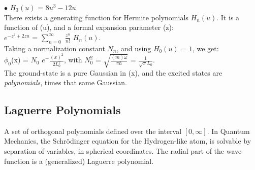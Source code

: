 \documentclass[a4paper, 10pt, onepage]{elegantbook}
\begin{document}
$\bullet$ $H_3(u)$ = $8u^3 - 12u$  \\

There exists a generating function for Hermite polynomials $H_n(u)$. It is a function of (u), and a formal expansion parameter (z):  \\

$e^{-z^2 + 2zu}$ = $\sum_{n = 0}^\infty$ $\frac{z^n}{n!}$ $H_n(u)$.  \\

Taking a normalization constant $N_n$, and using $H_0(u)$ = $1$, we get:  \\

$\phi_0$(x) = $N_0$ $e^- {\frac{(x)^2}{2L^{2}_0}}$, with $N^{2}_0$ = $\sqrt{\frac{(m) \omega}{\pi \hbar}}$ = $\frac{1}{\sqrt{\pi}L_0}$. \\

The ground-state is a pure Gaussian in (x), and the excited states are \emph{polynomials}, times that same Gaussian.  \\



\subsection{Laguerre Polynomials}

 A set of orthogonal polynomials defined over the interval $[0, \infty]$. In Quantum Mechanics, the Schrödinger equation for the Hydrogen-like atom, is solvable by separation of variables, in spherical coordinates. The radial part of the wave-function is a (generalized) Laguerre polynomial.  \\
\end{document}
